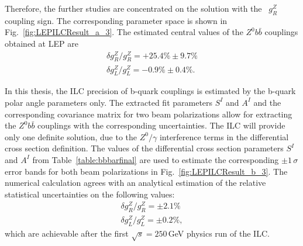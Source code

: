 Therefore, the further studies are concentrated on the solution with the \sm\ $g_R^Z$ coupling sign. 
The corresponding parameter space is shown in Fig.~\ref{fig:LEPILCResult_a_3}.
The estimated  central values of the $Z^0b\bar{b}$ couplings obtained at LEP are
\begin{eqnarray}
	\delta g_R^Z / g_R^Z = +25.4\% \pm 9.7\% \label{formula:LEPgR} \\
	\delta  g_L^Z / g_L^Z = -0.9\% \pm 0.4\%.
\end{eqnarray}



In this thesis, the ILC precision of b-quark couplings is estimated by the b-quark polar angle parameters only.
The extracted fit parameters $S^I$ and $A^I$ and the corresponding covariance matrix for two beam polarizations allow for extracting the $Z^0b\bar{b}$ couplings with the corresponding uncertainties. 
The ILC will provide only one definite solution, due to the $Z^0/\gamma$ interference terms in the differential cross section definition. 
The values of the differential cross section parameters $S^I$ and $A^I$ from Table~\ref{table:bbbarfinal} are used to estimate the corresponding $\pm1\,\sigma$ error bands for both beam polarizations in Fig.~\ref{fig:LEPILCResult_b_3}.
The numerical calculation agrees with an analytical estimation of the relative statistical uncertainties on the following values:
\begin{eqnarray}
	\delta g_R^Z / g_R^Z = \pm 2.1\% \label{formula:ILCgR} \\
	\delta  g_L^Z / g_L^Z = \pm 0.2\%,
\end{eqnarray}
which are achievable after the first $\sqrt{s} = 250$\,GeV physics run of the ILC. 



